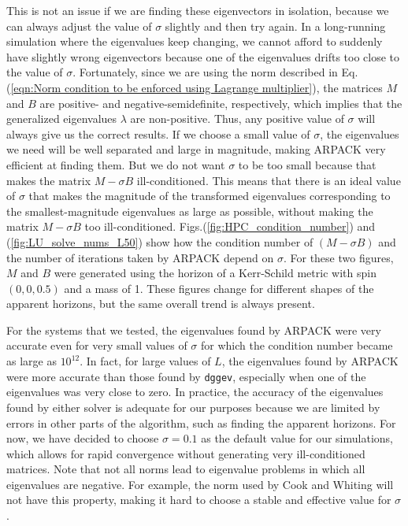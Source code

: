 \documentclass{iopjournal}
\begin{document}
This is not an issue if we are finding these eigenvectors in isolation, because we can always adjust the value of $\sigma$ slightly and then try again. In a long-running simulation where the eigenvalues keep changing, we cannot afford to suddenly have slightly wrong eigenvectors because one of the eigenvalues drifts too close to the value of $\sigma$. Fortunately, since we are using the norm described in Eq.(\ref{eqn:Norm condition to be enforced using Lagrange multiplier}), the matrices $M$ and $B$ are positive- and negative-semidefinite, respectively, which implies that the generalized eigenvalues $\lambda$ are non-positive.
Thus, any positive value of $\sigma$ will always give us the correct results. If we choose a small value of $\sigma$, the eigenvalues we need will be well separated and large in magnitude, making ARPACK very efficient at finding them. But we do not want $\sigma$ to be too small because that makes the matrix $M-\sigma B$ ill-conditioned. This means that there is an ideal value of $\sigma$ that makes the magnitude of the transformed eigenvalues corresponding to the smallest-magnitude eigenvalues as large as possible, without making the matrix $M - \sigma B$ too ill-conditioned. Figs.(\ref{fig:HPC_condition_number}) and (\ref{fig:LU_solve_nums_L50}) show how the condition number of $(M- \sigma B)$ and the number of iterations taken by ARPACK depend on $\sigma$. For these two figures, $M$ and $B$ were generated using the horizon of a Kerr-Schild metric with spin $(0,0,0.5)$ and a mass of 1. These figures change for different shapes of the apparent horizons, but the same overall trend is always present. 

For the systems that we tested, the eigenvalues found by ARPACK were very accurate even for very small values of $\sigma$ for which the condition number became as large as $10^{12}$. In fact, for large values of $L$, the eigenvalues found by ARPACK were more accurate than those found by \texttt{dggev}, especially when one of the eigenvalues was very close to zero. In practice, the accuracy of the eigenvalues found by either solver is adequate for our purposes because we are limited by errors in other parts of the algorithm, such as finding the apparent horizons. For now, we have decided to choose $\sigma = 0.1$ as the default value for our simulations, which allows for rapid convergence without generating very ill-conditioned matrices. Note that not all norms lead to eigenvalue problems in which all eigenvalues are negative. For example, the norm used by Cook and Whiting \cite{lovelace08_41} will not have this property, making it hard to choose a stable and effective value for $\sigma$.
\end{document}
